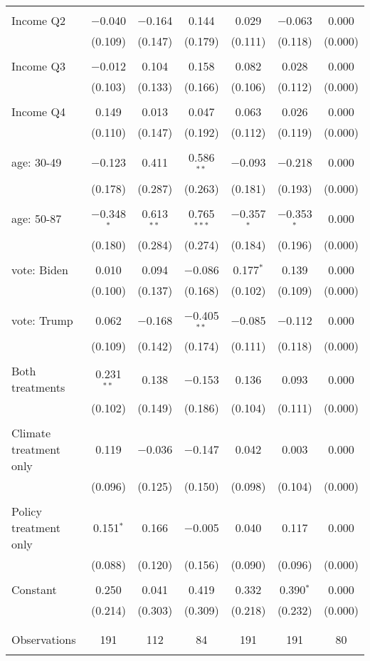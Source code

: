 \begin{tabular}{@{\extracolsep{5pt}}lcccccc}
  & & & & & & \\ 
 Income Q2 & $-$0.040 & $-$0.164 & 0.144 & 0.029 & $-$0.063 & 0.000 \\ 
  & (0.109) & (0.147) & (0.179) & (0.111) & (0.118) & (0.000) \\ 
  & & & & & & \\ 
 Income Q3 & $-$0.012 & 0.104 & 0.158 & 0.082 & 0.028 & 0.000 \\ 
  & (0.103) & (0.133) & (0.166) & (0.106) & (0.112) & (0.000) \\ 
  & & & & & & \\ 
 Income Q4 & 0.149 & 0.013 & 0.047 & 0.063 & 0.026 & 0.000 \\ 
  & (0.110) & (0.147) & (0.192) & (0.112) & (0.119) & (0.000) \\ 
  & & & & & & \\ 
 age: 30-49 & $-$0.123 & 0.411 & 0.586$^{**}$ & $-$0.093 & $-$0.218 & 0.000 \\ 
  & (0.178) & (0.287) & (0.263) & (0.181) & (0.193) & (0.000) \\ 
  & & & & & & \\ 
 age: 50-87 & $-$0.348$^{*}$ & 0.613$^{**}$ & 0.765$^{***}$ & $-$0.357$^{*}$ & $-$0.353$^{*}$ & 0.000 \\ 
  & (0.180) & (0.284) & (0.274) & (0.184) & (0.196) & (0.000) \\ 
  & & & & & & \\ 
 vote: Biden & 0.010 & 0.094 & $-$0.086 & 0.177$^{*}$ & 0.139 & 0.000 \\ 
  & (0.100) & (0.137) & (0.168) & (0.102) & (0.109) & (0.000) \\ 
  & & & & & & \\ 
 vote: Trump & 0.062 & $-$0.168 & $-$0.405$^{**}$ & $-$0.085 & $-$0.112 & 0.000 \\ 
  & (0.109) & (0.142) & (0.174) & (0.111) & (0.118) & (0.000) \\ 
  & & & & & & \\ 
 Both treatments & 0.231$^{**}$ & 0.138 & $-$0.153 & 0.136 & 0.093 & 0.000 \\ 
  & (0.102) & (0.149) & (0.186) & (0.104) & (0.111) & (0.000) \\ 
  & & & & & & \\ 
 Climate treatment only & 0.119 & $-$0.036 & $-$0.147 & 0.042 & 0.003 & 0.000 \\ 
  & (0.096) & (0.125) & (0.150) & (0.098) & (0.104) & (0.000) \\ 
  & & & & & & \\ 
 Policy treatment only & 0.151$^{*}$ & 0.166 & $-$0.005 & 0.040 & 0.117 & 0.000 \\ 
  & (0.088) & (0.120) & (0.156) & (0.090) & (0.096) & (0.000) \\ 
  & & & & & & \\ 
 Constant & 0.250 & 0.041 & 0.419 & 0.332 & 0.390$^{*}$ & 0.000 \\ 
  & (0.214) & (0.303) & (0.309) & (0.218) & (0.232) & (0.000) \\ 
  & & & & & & \\ 
\hline \\[-1.8ex] 

Observations & 191 & 112 & 84 & 191 & 191 & 80 \\ 
\hline 
\hline \\[-1.8ex] 
\end{tabular} 